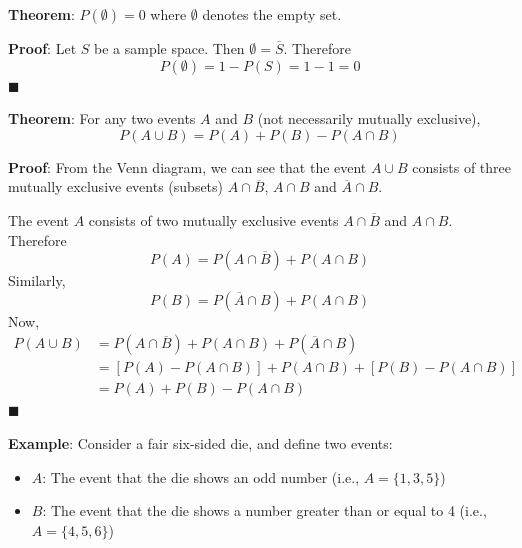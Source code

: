\documentclass[twoside]{book}
\begin{document}
\begin{textbox}
\textbf{Theorem}: $P(\emptyset) = 0$ where $\emptyset$ denotes the empty set.
\end{textbox}

\textbf{Proof}: Let $S$ be a sample space. Then $\emptyset = \overline{S}$. Therefore
$$P(\emptyset) = 1-P(S) = 1-1 = 0$$
\hfill\(\blacksquare\)

\begin{textbox}
\textbf{Theorem}: For any two events $A$ and $B$ (not necessarily mutually exclusive), $$P(A \cup B) = P(A) + P(B) - P(A \cap B)$$
\end{textbox}

\textbf{Proof}: From the Venn diagram, we can see that the event $A \cup B$ consists of three mutually exclusive events (subsets) $A \cap \overline{B}$, $A \cap B$ and $\overline{A} \cap B$.
\begin{center}
\end{center}


The event $A$ consists of two mutually exclusive events $A \cap \overline{B}$ and $A \cap B$. Therefore
$$P(A) = P(A \cap \overline{B})+P(A \cap B)$$
Similarly,
$$P(B) = P(\overline{A} \cap B)+P(A \cap B)$$
Now,
\begin{align*}
    P(A \cup B) &= P(A \cap \overline{B})+P(A \cap B)+P(\overline{A} \cap B) \\
    &= \left[P(A) - P(A \cap B)\right] + P(A \cap B) + \left[P(B) - P(A \cap B)\right] \\
    &=P(A) + P(B) - P(A \cap B)
\end{align*}
\hfill\(\blacksquare\)

\textbf{Example}: Consider a fair six-sided die, and define two events:
\begin{itemize}
    \item $A$: The event that the die shows an odd number (i.e., $A = \{1, 3, 5\}$)
    \item $B$: The event that the die shows a number greater than or equal to 4 (i.e.,  $A = \{4,5,6\}$)
\end{itemize}
\end{document}
